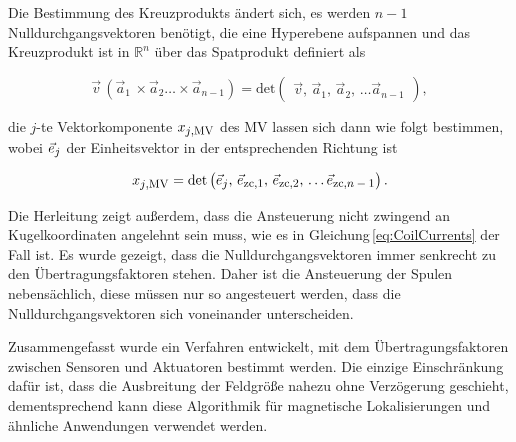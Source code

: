    Die Bestimmung des Kreuzprodukts ändert sich, es werden $n-1$ Nulldurchgangsvektoren benötigt, die eine Hyperebene aufspannen und das Kreuzprodukt ist in $\mathbb {R} ^{n}$ über das Spatprodukt definiert als \cite{fischer_bilinearformen_2025}
   
   \begin{equation}
      \vec{v} \, (\vec{a}_1 \, \times \vec{a}_2 \dots \times \vec{a}_{n-1}) = \text{det}\begin{pmatrix}
         \vec{v},\,\vec{a}_1,\,\vec{a}_2,\,\dots\vec{a}_{n-1}
         \end{pmatrix},
   \end{equation}

   die $j$-te Vektorkomponente $x_{\textrm{\footnotesize{$j$,MV}}}$ des MV lassen sich dann wie folgt bestimmen, wobei $\vec{e}_{\textrm{\footnotesize{$j$}}}$ der Einheitsvektor in der entsprechenden Richtung ist

   \begin{equation}
      x_{\textrm{\footnotesize{$j$,MV}}} = \text{det}\begin{pmatrix}
         \vec{e}_{\textrm{\footnotesize{$j$}}},\,\vec{e}_{\textrm{\footnotesize{zc,1}}},\,\vec{e}_{\textrm{\footnotesize{zc,2}}},\,\dots\vec{e}_{\textrm{\footnotesize{zc,$n-1$}}}
         \end{pmatrix}.
   \end{equation}

   Die Herleitung zeigt außerdem, dass die Ansteuerung nicht zwingend an Kugelkoordinaten angelehnt sein muss, wie es in Gleichung\,\ref{eq:CoilCurrents} der Fall ist. Es wurde gezeigt, dass die Nulldurchgangsvektoren immer senkrecht zu den Übertragungsfaktoren stehen. Daher ist die Ansteuerung der Spulen nebensächlich, diese müssen nur so angesteuert werden, dass die Nulldurchgangsvektoren sich voneinander unterscheiden. 

   Zusammengefasst wurde ein Verfahren entwickelt, mit dem Übertragungsfaktoren zwischen Sensoren und Aktuatoren bestimmt werden. Die einzige Einschränkung dafür ist, dass die Ausbreitung der Feldgröße nahezu ohne Verzögerung geschieht, dementsprechend kann diese Algorithmik für magnetische Lokalisierungen und ähnliche Anwendungen verwendet werden.


